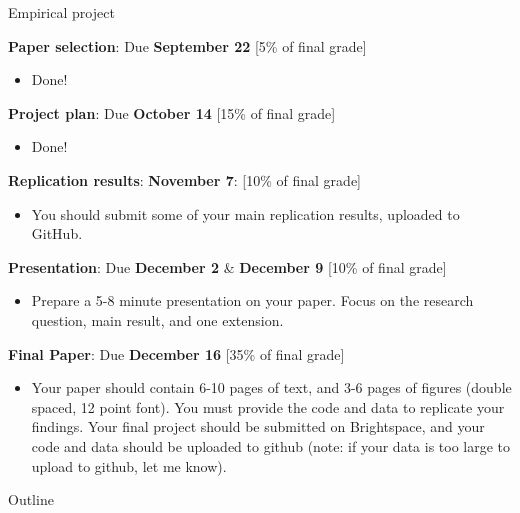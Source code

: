 \documentclass[compress, 8pt]{beamer}
\begin{document}
\begin{frame}{Empirical project}

\textbf{Paper selection}: Due \textbf{September 22} [5\% of final grade]
\begin{itemize}
\item Done! 
\end{itemize}

\textbf{Project plan}: Due \textbf{October 14} [15\% of final grade] 
\begin{itemize}
\item Done!
\end{itemize} 

\textbf{Replication results}: \textbf{November 7}: [10\% of final grade]
\begin{itemize}
\item You should submit some of your main replication results, uploaded to GitHub. 
\end{itemize}

\textbf{Presentation}: Due \textbf{December 2} \& \textbf{December 9} [10\% of final grade]
\begin{itemize}
\item Prepare a 5-8 minute presentation on your paper. Focus on the research question, main result, and one extension. 
\end{itemize}

\textbf{Final Paper}: Due \textbf{December 16} [35\% of final grade]
\begin{itemize}
\item Your paper should contain 6-10 pages of text, and 3-6 pages of figures (double spaced, 12 point font).
You must provide the code and data to replicate your findings. 
Your final project should be submitted on Brightspace, and your code and data should be uploaded to github (note: if your data is too large to upload to github, let me know). 
\end{itemize}

\end{frame}



\miniframesoff
\begin{frame}{Outline}
    \tableofcontents
\end{frame}
\miniframeson



\end{document}
